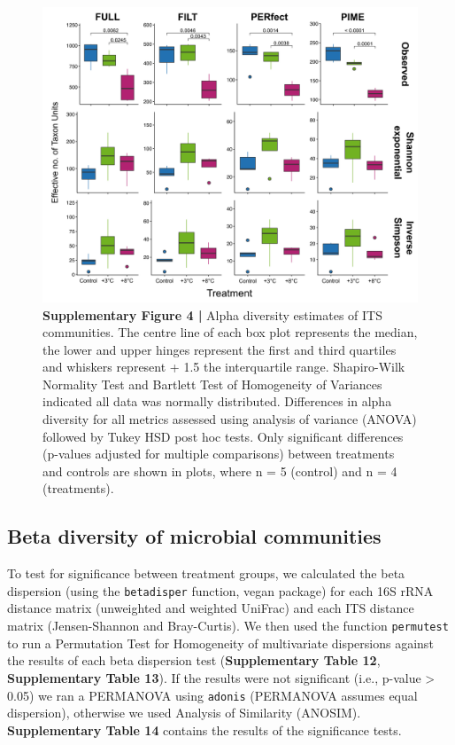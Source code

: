 \documentclass[
  10pt,
  letterpaper,
  DIV=11,
  numbers=noendperiod]{scrartcl}
\begin{document}
\begin{figure}

{\centering \includegraphics[width=1\textwidth,height=\textheight]{FIGURES/its_supp_alpha_div.png}

}

\caption{\textbf{Supplementary Figure 4 |} Alpha diversity estimates of
ITS communities. The centre line of each box plot represents the median,
the lower and upper hinges represent the first and third quartiles and
whiskers represent + 1.5 the interquartile range. Shapiro-Wilk Normality
Test and Bartlett Test of Homogeneity of Variances indicated all data
was normally distributed. Differences in alpha diversity for all metrics
assessed using analysis of variance (ANOVA) followed by Tukey HSD post
hoc tests. Only significant differences (p-values adjusted for multiple
comparisons) between treatments and controls are shown in plots, where n
= 5 (control) and n = 4 (treatments).}

\end{figure}

\newpage{}

\hypertarget{beta-diversity-of-microbial-communities}{%
\subsection{Beta diversity of microbial
communities}\label{beta-diversity-of-microbial-communities}}

To test for significance between treatment groups, we calculated the
beta dispersion (using the \texttt{betadisper} function, vegan package)
for each 16S rRNA distance matrix (unweighted and weighted UniFrac) and
each ITS distance matrix (Jensen-Shannon and Bray-Curtis). We then used
the function \texttt{permutest} to run a Permutation Test for
Homogeneity of multivariate dispersions against the results of each beta
dispersion test (\textbf{Supplementary Table 12}, \textbf{Supplementary
Table 13}). If the results were not significant (i.e., p-value
\textgreater{} 0.05) we ran a PERMANOVA using \texttt{adonis} (PERMANOVA
assumes equal dispersion), otherwise we used Analysis of Similarity
(ANOSIM). \textbf{Supplementary Table 14} contains the results of the
significance tests.
\end{document}
